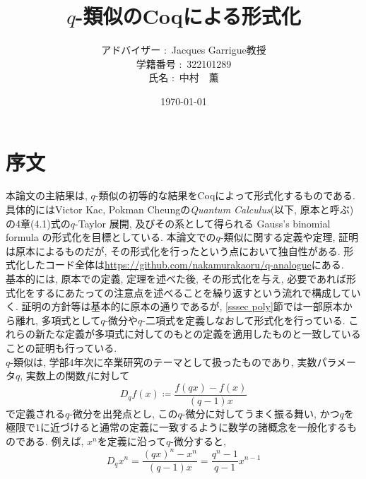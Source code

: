 \documentclass[11pt]{jarticle}
\theoremstyle{mystyle}
\newcommand{\Z}{\mathbb{Z}}
\newcommand{\R}{\mathbb{R}}
\newcommand{\qcoe}[2]{\left[\begin{array}{ccc}#1\\#2\end{array}\right]}
\newcommand{\0}{\textbf{0}}
\newcommand{\1}{\textbf{1}}
\newcommand{\2}{\textbf{2}}
\begin{document}
\title{$q$-類似のCoqによる形式化}
\author{アドバイザー $\colon$ Jacques Garrigue教授\\
           学籍番号 $\colon$ 322101289\\
           氏名 $\colon$ 中村　薫}
\date{\today}
\maketitle
\tableofcontents
\section{序文}
本論文の主結果は, $q$-類似の初等的な結果をCoqによって形式化するものである. 具体的にはVictor Kac, Pokman Cheungの{\it Quantum Calculus}\cite{Kac}(以下, 原本と呼ぶ)の4章(4.1)式の$q$-Taylor 展開, 及びその系として得られる Gauss's binomial formula の形式化を目標としている. 
本論文での$q$-類似に関する定義や定理, 証明は原本によるものだが, その形式化を行ったという点において独自性がある. 形式化したコード全体は\url{https://github.com/nakamurakaoru/q-analogue}\cite{coq qana}にある. \\
基本的には, 原本での定義, 定理を述べた後, その形式化を与え, 必要であれば形式化をするにあたっての注意点を述べることを繰り返すという流れで構成していく. 
証明の方針等は基本的に原本の通りであるが, \ref{sssec poly}節では一部原本から離れ, 多項式として$q$-微分や$q$-二項式を定義しなおして形式化を行っている. これらの新たな定義が多項式に対してのもとの定義を適用したものと一致していることの証明も行っている. \\
$q$-類似は, 学部4年次に卒業研究のテーマとして扱ったものであり, 実数パラメータ$q$, 実数上の関数$f$に対して
\[
  D_q f(x) \coloneqq \frac{f(qx) - f(x)}{(q - 1) x}
\]
で定義される$q$-微分を出発点とし, この$q$-微分に対してうまく振る舞い, かつ$q$を極限で$1$に近づけると通常の定義に一致するように数学の諸概念を一般化するものである.
例えば, $x^n$を定義に沿って$q$-微分すると, 
\[
  D_q x^n = \frac{(qx)^n - x^n}{(q - 1) x} = \frac{q^n - 1}{q - 1} x^{n - 1}
\]
\end{document}
